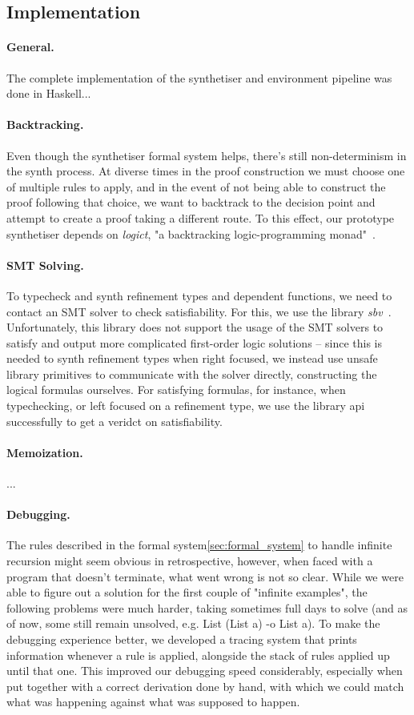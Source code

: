 \documentclass{llncs}
\newcommand{\mypara}[1]{\paragraph{\textbf{#1}.}}
\begin{document}
\subsection{Implementation}

\mypara{General} The complete implementation of the synthetiser and environment
pipeline was done in Haskell...

\mypara{Backtracking} Even though the synthetiser formal system helps, there's
still non-determinism in the synth process. At diverse times in the proof
construction we must choose one of multiple rules to apply, and in the event of
not being able to construct the proof following that choice, we want to
backtrack to the decision point and attempt to create a proof taking a different
route. To this effect, our prototype synthetiser depends on \emph{logict}, "a backtracking logic-programming
monad"~\cite{logict}.

\mypara{SMT Solving} To typecheck and synth refinement types and dependent
functions, we need to contact an SMT solver to check satisfiability. For this,
we use the library \emph{sbv}~\cite{sbv}. Unfortunately, this library does not
support the usage of the SMT solvers to satisfy and output more complicated
first-order logic solutions -- since this is needed to synth refinement types
when right focused, we instead use unsafe library primitives to communicate with
the solver directly, constructing the logical formulas ourselves. For 
satisfying formulas, for instance, when typechecking, or left focused on a
refinement type, we use the library api successfully to get a veridct on
satisfiability.

\mypara{Memoization} ...

\mypara{Debugging} The rules described in the formal
system\ref{sec:formal_system} to handle infinite recursion might seem obvious in
retrospective, however, when faced with a program that doesn't terminate, what
went wrong is not so clear. While we were able to figure out a solution for the
first couple of "infinite examples", the following problems were much harder,
taking sometimes full days to solve (and as of now, some still remain unsolved,
e.g. List (List a) -o List a). To make the debugging experience better, we
developed a tracing system that prints information whenever a rule is applied,
alongside the stack of rules applied up until that one. This improved our
debugging speed considerably, especially when put together with a correct
derivation done by hand, with which we could match what was happening against
what was supposed to happen.
\end{document}
